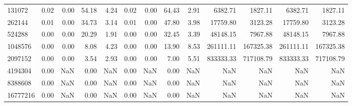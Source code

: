 \begin{tabular}{lrrrrrrrrrrrr}
131072 & 0.02 & 0.00 & 54.18 & 4.24 & 0.02 & 0.00 & 64.43 & 2.91 & 6382.71 & 1827.11 & 6382.71 & 1827.11 \\
262144 & 0.01 & 0.00 & 34.73 & 3.14 & 0.01 & 0.00 & 47.80 & 3.98 & 17759.80 & 3123.28 & 17759.80 & 3123.28 \\
524288 & 0.00 & 0.00 & 20.29 & 1.91 & 0.00 & 0.00 & 32.45 & 3.39 & 48148.15 & 7967.88 & 48148.15 & 7967.88 \\
1048576 & 0.00 & 0.00 & 8.08 & 4.23 & 0.00 & 0.00 & 13.90 & 8.53 & 261111.11 & 167325.38 & 261111.11 & 167325.38 \\
2097152 & 0.00 & 0.00 & 3.54 & 2.93 & 0.00 & 0.00 & 7.00 & 5.51 & 833333.33 & 717108.79 & 833333.33 & 717108.79 \\
4194304 & 0.00 & NaN & 0.00 & NaN & 0.00 & NaN & 0.00 & NaN & NaN & NaN & NaN & NaN \\
8388608 & 0.00 & NaN & 0.00 & NaN & 0.00 & NaN & 0.00 & NaN & NaN & NaN & NaN & NaN \\
16777216 & 0.00 & NaN & 0.00 & NaN & 0.00 & NaN & 0.00 & NaN & NaN & NaN & NaN & NaN \\
\bottomrule
\end{tabular}
